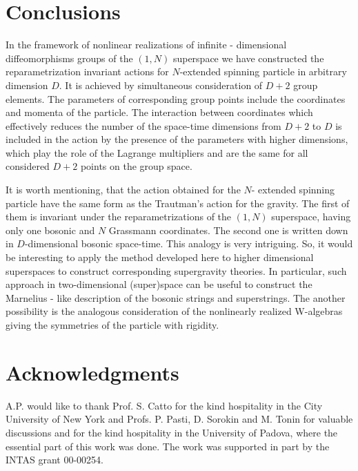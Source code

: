 \documentclass[a4paper,twocolumn,showpacs,preprintnumbers,amsmath,amssymb]{revtex4}
\begin{document}
\section{Conclusions}
In the framework of nonlinear realizations of infinite - dimensional
diffeomorphisms groups of  the $(1,N)$
superspace we have constructed the reparametrization
invariant actions
for $N$-extended spinning particle in arbitrary
dimension $D$. It is achieved by simultaneous consideration of
$D+2$ group elements. The parameters of corresponding group points
include the coordinates and momenta of the particle.
The interaction between coordinates which effectively reduces the number of
the space-time dimensions from $D+2$ to $D$ is included in the action
by the presence of the parameters
with higher dimensions, which play the role of the Lagrange multipliers
and are  the same for all considered $D+2$
points on the group space.

It is worth mentioning, that the action obtained for the $N$- extended
spinning particle have the same form as the Trautman's\cite{T} action
for the gravity\cite{P_0}.  The first of them is invariant under the
reparametrizations of  the $(1,N)$
superspace, having only one bosonic and $N$ Grassmann coordinates. The second one
is written down in $D$-dimensional bosonic space-time. This analogy is very intriguing.
So, it would be interesting to apply the method developed here
to  higher dimensional superspaces to construct corresponding
supergravity theories. In particular, such approach in two-dimensional
(super)space can be useful to construct the Marnelius - like description
of the bosonic strings and superstrings. The another possibility is the
analogous consideration of the nonlinearly realized W-algebras giving the
symmetries of the particle with rigidity.

\section*{Acknowledgments}
A.P. would like to thank Prof. S. Catto for the kind hospitality in the
City University of New York and Profs. P. Pasti, D. Sorokin and M. Tonin
for valuable discussions and for the kind hospitality in the
University of Padova, where the
essential part of this work was done.
The work  was supported in part by the
INTAS grant 00-00254.
\end{document}
